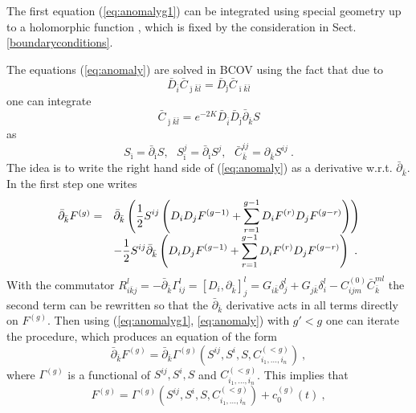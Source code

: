 \documentclass[12pt]{article}
\newcommand{\ds}{\displaystyle}
\begin{document}
The first equation (\ref{eq:anomalyg1}) can be integrated using
special geometry up to a holomorphic function \cite{BCOVI}, which
is fixed by the consideration in Sect. \ref{boundaryconditions}.

The equations  (\ref{eq:anomaly}) are solved in BCOV using the
fact that due to
\begin{equation}
\bar D_{\bar i} \bar C_{\bar \jmath \bar k \bar l}=\bar D_{\bar \jmath} \bar C_{\bar
\imath \bar k \bar l}
\end{equation}
one can integrate
\begin{equation}
\bar C_{\bar \jmath \bar k \bar l}=e^{-2 K} \bar D_{\bar i}\bar D_{\bar \jmath}
\bar \partial_{\bar k} S
\end{equation}
as
\begin{equation}
S_{\bar \imath} =\bar \partial_{\bar \imath} S,\ \ \
S^j_{\bar \imath} =\bar \partial_{\bar \imath} S^j,\ \ \
\bar C_{\bar k}^{ij}= \partial_{\bar k} S^{ij}\ .
\label{eq:propagators}
\end{equation}
The idea is to write the right hand side of (\ref{eq:anomaly}) as
a derivative w.r.t. $\bar \partial_{\bar k}$. In the first step
one writes
\begin{equation}
\begin{array}{rl}
{\bar \partial}_{\bar k} F^{(g)}=&\ds{{\bar \partial}_{\bar k}
\left({1\over 2}S^{ij}
\left(D_i D_j F^{(g-1)}+ \sum_{r=1}^{g-1}D_i F^{(r)}  D_j F^{(g-r)}\right)\right)} \\[ 3 mm]
&\ds{-{1\over 2} S^{ij}{\bar \partial}_{\bar k}\left(D_i D_j F^{(g-1)}+
\sum_{r=1}^{g-1}D_i F^{(r)}  D_j F^{(g-r)}\right)\ .}
\end{array}
\label{int1:anomaly}
\end{equation}
With the commutator $R^l_{i\bar k j}=-\bar \partial_{\bar k}
\Gamma_{ij}^l=[D_i,\partial_{\bar k}]^l_j= G_{i\bar
k}\delta^l_j+G_{j\bar k}\delta^l_i-C^{(0)}_{ijm} {\bar C}_{\bar
k}^{ml}$ the  second term can be rewritten so that the $\bar
\partial_{\bar k}$ derivative acts in all terms directly on
$F^{(g)}$. Then using (\ref{eq:anomalyg1}, \ref{eq:anomaly}) with
$g'<g$ one can iterate the procedure, which produces an equation
of the form
\begin{equation}
{\bar \partial}_{\bar k} F^{(g)}=\bar \partial_{\bar k}
\Gamma^{(g)}(S^{ij},S^i,S, C^{(<g)}_{i_1,\ldots,i_n})\ ,
\end{equation}
where $\Gamma^{(g)}$ is a functional of  $S^{ij},S^i,S$ and $C^{(<g)}_{i_1,\ldots,i_n}$.
This implies that
\begin{equation}
F^{(g)}=\Gamma^{(g)}(S^{ij},S^i,S, C^{(<g)}_{i_1,\ldots,i_n})+c^{(g)}_0(t)\ ,
\label{fgformal}
\end{equation}
\end{document}
